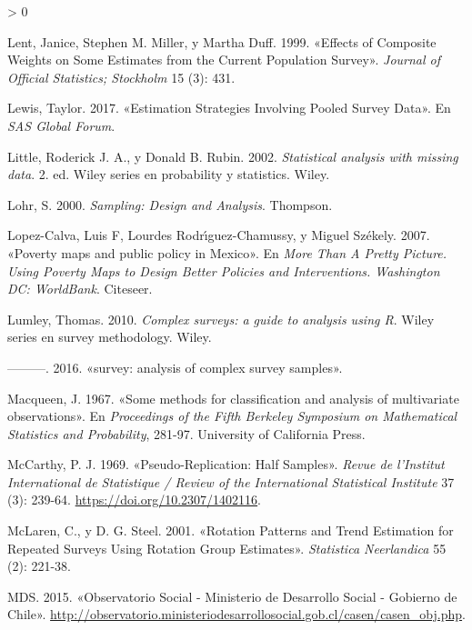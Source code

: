\documentclass[
  12pt,
  spanish,
]{book}
\newlength{\cslhangindent}
\newenvironment{CSLReferences}[2] %
 {%
  \setlength{\parindent}{0pt}
  \ifodd #1 \everypar{\setlength{\hangindent}{\cslhangindent}}\ignorespaces\fi
  \ifnum #2 > 0
  \setlength{\parskip}{#2\baselineskip}
  \fi
 }%
 {}
\begin{document}
\begin{CSLReferences}{1}{0}
\leavevmode\hypertarget{ref-Lent_Miller_Duff_1999}{}%
Lent, Janice, Stephen M. Miller, y Martha Duff. 1999. {«Effects of Composite Weights on Some Estimates from the Current Population Survey»}. \emph{Journal of Official Statistics; Stockholm} 15 (3): 431.

\leavevmode\hypertarget{ref-Lewis_2017}{}%
Lewis, Taylor. 2017. {«Estimation Strategies Involving Pooled Survey Data»}. En \emph{SAS Global Forum}.

\leavevmode\hypertarget{ref-Little_Rubin_2002}{}%
Little, Roderick J. A., y Donald B. Rubin. 2002. \emph{Statistical analysis with missing data}. 2. ed. Wiley series en probability y statistics. Wiley.

\leavevmode\hypertarget{ref-Loh}{}%
Lohr, S. 2000. \emph{Sampling: Design and Analysis}. Thompson.

\leavevmode\hypertarget{ref-lopez2007poverty}{}%
Lopez-Calva, Luis F, Lourdes Rodrı́guez-Chamussy, y Miguel Székely. 2007. {«Poverty maps and public policy in Mexico»}. En \emph{More Than A Pretty Picture. Using Poverty Maps to Design Better Policies and Interventions. Washington DC: WorldBank}. Citeseer.

\leavevmode\hypertarget{ref-Lumley_2010}{}%
Lumley, Thomas. 2010. \emph{Complex surveys: a guide to analysis using R}. Wiley series en survey methodology. Wiley.

\leavevmode\hypertarget{ref-TL}{}%
---------. 2016. {«survey: analysis of complex survey samples»}.

\leavevmode\hypertarget{ref-Macqueen_1967}{}%
Macqueen, J. 1967. {«Some methods for classification and analysis of multivariate observations»}. En \emph{Proceedings of the Fifth Berkeley Symposium on Mathematical Statistics and Probability}, 281-97. University of California Press.

\leavevmode\hypertarget{ref-McCarthy_1969}{}%
McCarthy, P. J. 1969. {«Pseudo-Replication: Half Samples»}. \emph{Revue de l'Institut International de Statistique / Review of the International Statistical Institute} 37 (3): 239-64. \url{https://doi.org/10.2307/1402116}.

\leavevmode\hypertarget{ref-McLaren_Steel_2001}{}%
McLaren, C., y D. G. Steel. 2001. {«Rotation Patterns and Trend Estimation for Repeated Surveys Using Rotation Group Estimates»}. \emph{Statistica Neerlandica} 55 (2): 221-38.

\leavevmode\hypertarget{ref-MDS-CL_2015}{}%
MDS. 2015. {«Observatorio Social - Ministerio de Desarrollo Social - Gobierno de Chile»}. \url{http://observatorio.ministeriodesarrollosocial.gob.cl/casen/casen_obj.php}.


\end{CSLReferences}
\end{document}

